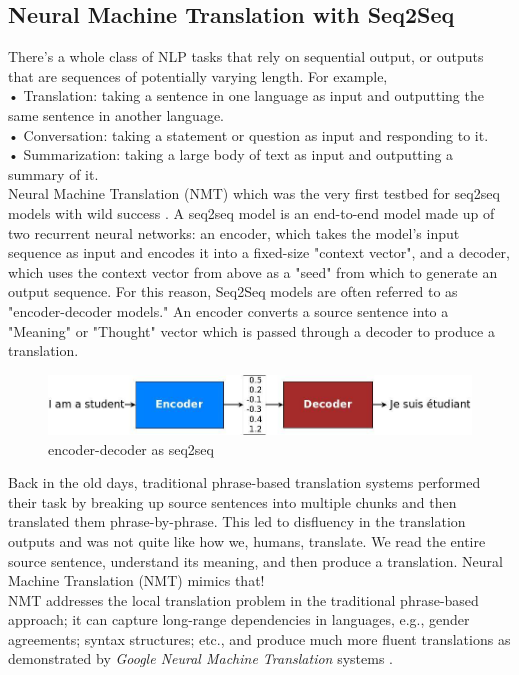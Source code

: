 \subsection{Neural Machine Translation with Seq2Seq} 
There’s a whole
class of NLP tasks that rely on sequential output, or outputs that are
sequences of potentially varying length. For example,\\
• Translation: taking a sentence in one language as input and outputting
the same sentence in another language.\\
• Conversation: taking a statement or question as input and responding
to it.\\
• Summarization: taking a large body of text as input and outputting
a summary of it.
\\Neural Machine Translation (NMT) which was the very first testbed for seq2seq models with wild success \cite{web016}. A seq2seq model is an end-to-end model made up of two recurrent neural networks: an encoder, which takes the model’s input sequence as input and
encodes it into a fixed-size "context vector", and a decoder, which uses the context vector from above as a "seed"
from which to generate an output sequence. For this reason, Seq2Seq models are often referred to as "encoder-decoder
models." An encoder converts a source sentence into a "Meaning" or "Thought" vector which is passed through a decoder to produce a translation.\\
  \begin{figure}[H]%
    \center%
    \includegraphics[width=\textwidth]{images/amir/encdec.jpg}%
    \caption[This is a encdec image]{encoder-decoder as seq2seq}\label{fig:encdec}%
  \end{figure}
  Back in the old days, traditional phrase-based translation systems performed their task by breaking up source sentences into multiple chunks and then translated them phrase-by-phrase. This led to disfluency in the translation outputs and was not quite like how we, humans, translate. We read the entire source sentence, understand its meaning, and then produce a translation. Neural Machine Translation (NMT) mimics that!\\
  NMT addresses the local translation problem in the traditional phrase-based approach; it can capture long-range dependencies in languages, e.g., gender agreements; syntax structures; etc., and produce much more fluent translations as demonstrated by \textit{Google Neural Machine Translation} systems \cite{web017}.\\
